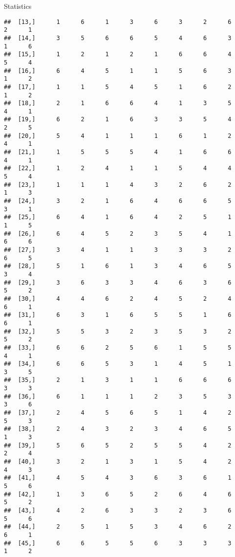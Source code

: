 \documentclass[
  ignorenonframetext,
]{beamer}
\begin{document}
\begin{frame}[fragile]{Statistics}
\begin{verbatim}
##  [13,]      1      6      1      3      6      3      2      6      2      1
##  [14,]      3      5      6      6      5      4      6      3      1      6
##  [15,]      1      2      1      2      1      6      6      4      5      4
##  [16,]      6      4      5      1      1      5      6      3      1      2
##  [17,]      1      1      5      4      5      1      6      2      1      2
##  [18,]      2      1      6      6      4      1      3      5      4      1
##  [19,]      6      2      1      6      3      3      5      4      2      5
##  [20,]      5      4      1      1      1      6      1      2      4      1
##  [21,]      1      5      5      5      4      1      6      6      4      1
##  [22,]      1      2      4      1      1      5      4      4      5      4
##  [23,]      1      1      1      4      3      2      6      2      1      3
##  [24,]      3      2      1      6      4      6      6      5      3      1
##  [25,]      6      4      1      6      4      2      5      1      1      5
##  [26,]      6      4      5      2      3      5      4      1      6      6
##  [27,]      3      4      1      1      3      3      3      2      6      5
##  [28,]      5      1      6      1      3      4      6      5      3      4
##  [29,]      3      6      3      3      4      6      3      6      5      2
##  [30,]      4      4      6      2      4      5      2      4      6      1
##  [31,]      6      3      1      6      5      5      1      6      6      1
##  [32,]      5      5      3      2      3      5      3      2      5      2
##  [33,]      6      6      2      5      6      1      5      5      4      1
##  [34,]      6      6      5      3      1      4      5      1      3      5
##  [35,]      2      1      3      1      1      6      6      6      3      3
##  [36,]      6      1      1      1      2      3      5      3      3      6
##  [37,]      2      4      5      6      5      1      4      2      5      3
##  [38,]      2      4      3      2      3      4      6      5      1      3
##  [39,]      5      6      5      2      5      5      4      2      2      4
##  [40,]      3      2      1      3      1      5      4      2      4      3
##  [41,]      4      5      4      3      6      3      6      1      5      6
##  [42,]      1      3      6      5      2      6      4      6      5      2
##  [43,]      4      2      6      3      3      2      3      6      5      6
##  [44,]      2      5      1      5      3      4      6      2      6      1
##  [45,]      6      6      5      5      6      3      3      3      1      2

\end{verbatim}
\end{frame}
\end{document}
